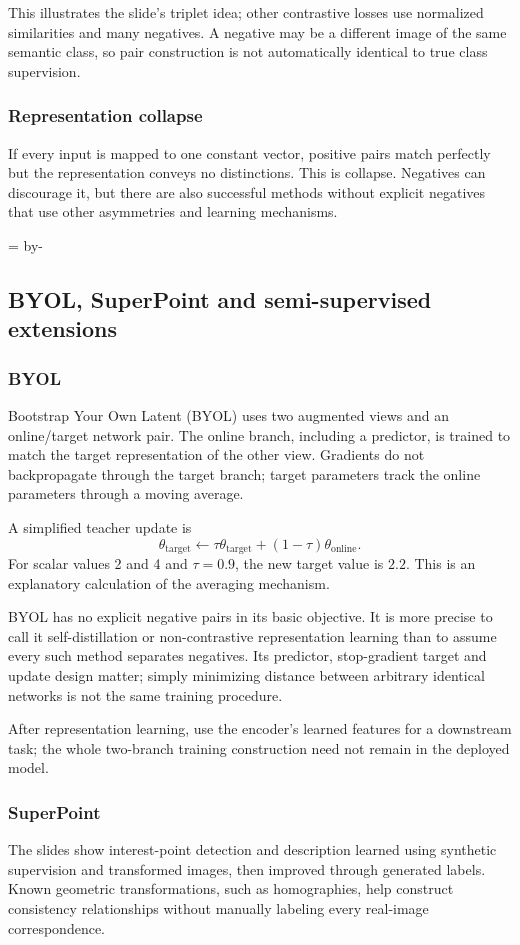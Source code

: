 \documentclass[11pt]{article}
\newcommand{\newsubsection}[1]{\par\begingroup\skip0=\pagegoal\advance\skip0 by-\pagetotal\ifdim\skip0<12\baselineskip\newpage\fi\endgroup\subsection{#1}}
\begin{document}
This illustrates the slide's triplet idea; other contrastive losses use normalized similarities and many negatives. A negative may be a different image of the same semantic class, so pair construction is not automatically identical to true class supervision.

\subsubsection{Representation collapse}
If every input is mapped to one constant vector, positive pairs match perfectly but the representation conveys no distinctions. This is collapse. Negatives can discourage it, but there are also successful methods without explicit negatives that use other asymmetries and learning mechanisms.

\newsubsection{BYOL, SuperPoint and semi-supervised extensions}
\subsubsection{BYOL}
Bootstrap Your Own Latent (BYOL) uses two augmented views and an online/target network pair. The online branch, including a predictor, is trained to match the target representation of the other view. Gradients do not backpropagate through the target branch; target parameters track the online parameters through a moving average.

A simplified teacher update is
\[
\theta_{\mathrm{target}}\leftarrow
\tau\theta_{\mathrm{target}}+(1-\tau)\theta_{\mathrm{online}}.
\]
For scalar values 2 and 4 and $\tau=0.9$, the new target value is $2.2$. This is an explanatory calculation of the averaging mechanism.

BYOL has no explicit negative pairs in its basic objective. It is more precise to call it self-distillation or non-contrastive representation learning than to assume every such method separates negatives. Its predictor, stop-gradient target and update design matter; simply minimizing distance between arbitrary identical networks is not the same training procedure.

After representation learning, use the encoder's learned features for a downstream task; the whole two-branch training construction need not remain in the deployed model.

\subsubsection{SuperPoint}
The slides show interest-point detection and description learned using synthetic supervision and transformed images, then improved through generated labels. Known geometric transformations, such as homographies, help construct consistency relationships without manually labeling every real-image correspondence.
\end{document}
